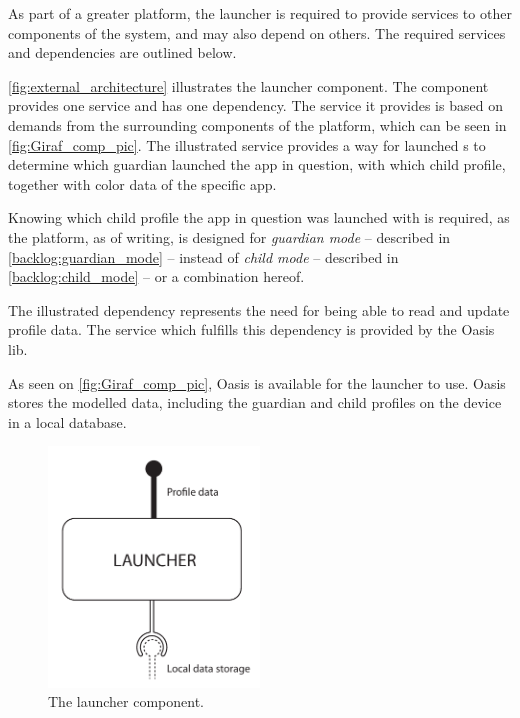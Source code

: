 \label{design:overview}
\label{sec:design_overview}
As part of a greater platform, the launcher is required to provide services to other components of the \giraf[] system, and may also depend on others.
The required services and dependencies are outlined below.

\autoref{fig:external_architecture} illustrates the \giraf[] launcher component. The component provides one service and has one dependency.
The service it provides is based on demands from the surrounding components of the \giraf[] platform, which can be seen in \autoref{fig:Giraf_comp_pic}.
The illustrated service provides a way for launched \girafapp[]s to determine which guardian launched the app in question, with which child profile, together with color data of the specific app.

Knowing which child profile the app in question was launched with is required, as the \giraf[] platform, as of writing, is designed for \emph{guardian mode} -- described in \autoref{backlog:guardian_mode} -- instead of \emph{child mode} -- described in \autoref{backlog:child_mode} -- or a combination hereof.

The illustrated dependency represents the need for being able to read and update profile data. The service which fulfills this dependency is provided by the Oasis lib. 

As seen on \autoref{fig:Giraf_comp_pic}, Oasis is available for the launcher to use. Oasis stores the modelled data, including the guardian and child profiles on the device in a local database.

\begin{figure}[h]
	\centering
	\includegraphics[width=0.5\textwidth]{gfx/external_launcher_architecture.pdf}
	\caption{The \giraf[] launcher component.}
	\label{fig:external_architecture}
\end{figure}

